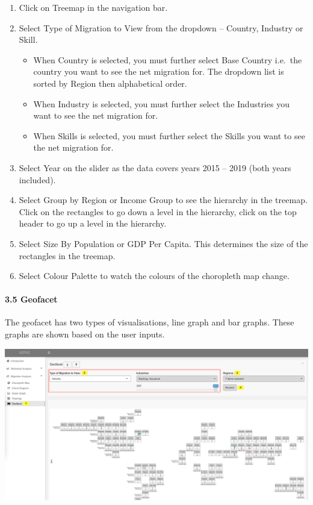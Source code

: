 \documentclass[
]{article}
\begin{document}
\begin{enumerate}
\def\labelenumi{\arabic{enumi}.}
\item
  Click on Treemap in the navigation bar.
\item
  Select Type of Migration to View from the dropdown -- Country,
  Industry or Skill.

  \begin{itemize}
  \item
    When Country is selected, you must further select Base Country
    i.e.~the country you want to see the net migration for. The dropdown
    list is sorted by Region then alphabetical order.
  \item
    When Industry is selected, you must further select the Industries
    you want to see the net migration for.
  \item
    When Skills is selected, you must further select the Skills you want
    to see the net migration for.
  \end{itemize}
\item
  Select Year on the slider as the data covers years 2015 -- 2019 (both
  years included).
\item
  Select Group by Region or Income Group to see the hierarchy in the
  treemap. Click on the rectangles to go down a level in the hierarchy,
  click on the top header to go up a level in the hierarchy.
\item
  Select Size By Population or GDP Per Capita. This determines the size
  of the rectangles in the treemap.
\item
  Select Colour Palette to watch the colours of the choropleth map
  change.
\end{enumerate}

\hypertarget{geofacet}{%
\paragraph{3.5 Geofacet}\label{geofacet}}

The geofacet has two types of visualisations, line graph and bar graphs.
These graphs are shown based on the user inputs.

\includegraphics[width=1\textwidth,height=\textheight]{Images/13-facet-bar.png}
\end{document}
